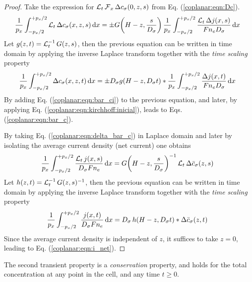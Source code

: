 \begin{proof}
	Take the expression for $\operatorname{\mathcal{L}}_{t}\operatorname{\mathcal{F}}_{x} \Delta c_{\sigma}(0,z,s)$ from Eq. (\ref{coplanar:eqn:Dc}).
	\begin{equation}
		\frac{1}{p_{x}}
		\int_{-p_{x}/2}^{+p_{x}/2} \operatorname{\mathcal{L}}_{t} \Delta c_{\sigma}(x,z,s) \,\mathrm{d}x =
		\pm G\!\left( H-z, \frac{s}{D_{\sigma}} \right)
		\frac{1}{p_{x}}
		\int_{-p_{x}/2}^{+p_{x}/2} \frac{\operatorname{\mathcal{L}}_{t}\Delta j(x,s)}{F n_{e} D_{\sigma}} \,\mathrm{d}x
	\end{equation}
	Let $g(z,t) = \operatorname{\mathcal{L}}_{t}^{-1} G(z,s)$,
	then the previous equation can be written in time domain
	by applying the inverse Laplace transform
	together with the \emph{time scaling} property
	\begin{equation}
		\frac{1}{p_{x}} \int_{-p_{x}/2}^{+p_{x}/2} \Delta c_{\sigma}(x,z,t) \,\mathrm{d}x =
		 \pm D_{\sigma} g(H-z, D_{\sigma}t) * \frac{1}{p_{x}}
		\int_{-p_{x}/2}^{+p_{x}/2} \frac{\Delta j(x,t)}{F n_{e} D_{\sigma}} \,\mathrm{d}x
	\end{equation}
	By adding Eq. (\ref{coplanar:eqn:bar_ci}) to the previous equation,
	and later, by applying Eq. (\ref{coplanar:eqn:kirchhoff:inicial}),
	leads to Eqs. (\ref{coplanar:eqn:bar_c}).

	By taking Eq. (\ref{coplanar:eqn:delta_bar_c}) in Laplace domain
	and later by isolating the average current density (net current) one obtains
	\begin{equation}
		\frac{1}{p_{x}} \int_{-p_{x}/2}^{+p_{x}/2} \frac{\operatorname{\mathcal{L}}_{t} j(x,s)}{D_{\sigma} F n_{e}} \,\mathrm{d}x
		= G\!\left( H - z, \frac{s}{D_{\sigma}} \right)^{-1} \operatorname{\mathcal{L}}_{t} \Delta\bar{c}_{\sigma}(z,s)
	\end{equation}
	Let $h(z,t) = \operatorname{\mathcal{L}}_{t}^{-1} G(z,s)^{-1}$,
	then the previous equation can be written in time domain
	by applying the inverse Laplace transform
	together with the \emph{time scaling} property
	\begin{equation}
		\frac{1}{p_{x}} \int_{-p_{x}/2}^{+p_{x}/2} \frac{j(x,t)}{D_{\sigma} F n_{e}} \,\mathrm{d}x
		= D_{\sigma}\, h(H - z, D_{\sigma} t) * \Delta\bar{c}_{\sigma} (z,t)
	\end{equation}
	Since the average current density is independent of $z$,
	it suffices to take $z=0$, leading to Eq. (\ref{coplanar:eqn:i_net}).
\end{proof}

The second transient property is a \emph{conservation} property,
and holds for the total concentration at any point in the cell,
and any time $t \geq 0$.


